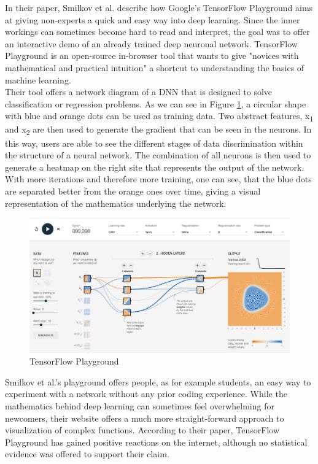\documentclass{acmsiggraph}               %
\begin{document}
In their paper, Smilkov et al. describe how Google's TensorFlow Playground aims at giving non-experts a quick and easy way into deep learning. Since the inner workings can sometimes become hard to read and interpret, the goal was to offer an interactive demo of an already trained deep neuronal network. TensorFlow Playground is an open-source in-browser tool that wants to give "novices with mathematical and practical intuition" \cite[p.~1]{Smilkov2017} a shortcut to understanding the basics of machine learning.\\
Their tool offers a network diagram of a DNN that is designed to solve classification or regression problems. As we can see in Figure \ref{fig:tensorflow_playground}, a circular shape with blue and orange dots can be used as training data. Two abstract features, x\textsubscript{1} and x\textsubscript{2} are then used to generate the gradient that can be seen in the neurons. In this way, users are able to see the different stages of data discrimination within the structure of a neural network. The combination of all neurons is then used to generate a heatmap on the right site that represents the output of the network. With more iterations and therefore more training, one can see, that the blue dots are separated better from the orange ones over time, giving a visual representation of the mathematics underlying the network.

\begin{figure}
\includegraphics[width=\textwidth]{tensorflow_playground_smilkov_et_al}
\caption{TensorFlow Playground \protect\cite{Smilkov2017}}
\label{fig:tensorflow_playground}
\centering
\end{figure}

Smilkov et al.'s playground offers people, as for example students, an easy way to experiment with a network without any prior coding experience. While the mathematics behind deep learning can sometimes feel overwhelming for newcomers, their website offers a much more straight-forward approach to visualization of complex functions. According to their paper, TensorFlow Playground has gained positive reactions on the internet, although no statistical evidence was offered to support their claim.
\end{document}
